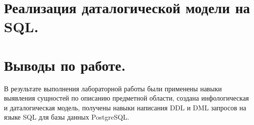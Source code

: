 \newpage

\section{Реализация даталогической модели на SQL.}
\tiny

\newpage

\normalsize

\newpage

\section{Выводы по работе.}
В результате выполнения лабораторной работы были применены навыки выявления
сущностей по описанию предметной области, создана инфологическая и даталогическая
модель, получены навыки написания DDL и DML запросов на языке SQL для базы данных
PostgreSQL.